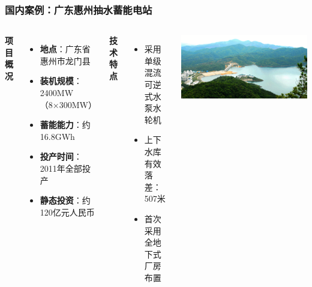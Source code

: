 \documentclass[aspectratio=169]{beamer}
\begin{document}
\begin{frame}
    \frametitle{国内案例：广东惠州抽水蓄能电站}
    \begin{columns}
        \textbf{项目概况}
        \begin{itemize}
            \item \textbf{地点}：广东省惠州市龙门县
            \item \textbf{装机规模}：2400MW（8×300MW）
            \item \textbf{蓄能能力}：约16.8GWh
            \item \textbf{投产时间}：2011年全部投产
            \item \textbf{静态投资}：约120亿元人民币
        \end{itemize}
        
        \textbf{技术特点}
        \begin{itemize}
            \item 采用单级混流可逆式水泵水轮机
            \item 上下水库有效落差：507米
            \item 首次采用全地下式厂房布置
        \end{itemize}
        
        \centering
        \includegraphics[width=\textwidth]{fig/惠州抽水蓄能电站示意图.jpg}
    \end{columns}
\end{frame}
\end{document}

